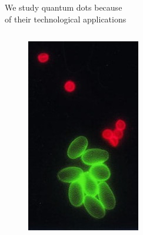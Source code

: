 \documentclass[12pt,usenames,dvipsnames]{beamer}
\begin{document}
\begin{frame}{We study quantum dots because \\ of their technological applications}
\begin{columns}
    \begin{column}{0.25\textwidth}
      \begin{figure}
        \vspace{-1.2em}
        \includegraphics[width=\textwidth, height=0.4\textheight]{figures/devices/contrast.jpg}
      \end{figure}
    \end{column}


\end{columns}
\end{frame}
\end{document}
